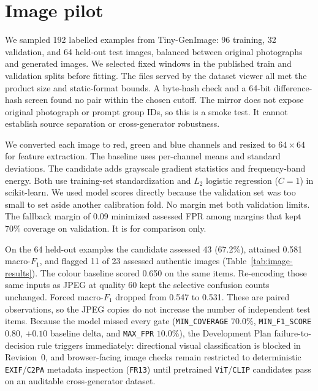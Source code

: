 \documentclass[11pt]{article}
\begin{document}
\section{Image pilot}

We sampled 192 labelled examples from Tiny-GenImage: 96 training, 32 validation, and 64 held-out test images, balanced between original photographs and generated images. We selected fixed windows in the published train and validation splits before fitting. The files served by the dataset viewer all met the product size and static-format bounds. A byte-hash check and a 64-bit difference-hash screen found no pair within the chosen cutoff. The mirror does not expose original photograph or prompt group IDs, so this is a smoke test. It cannot establish source separation or cross-generator robustness.

We converted each image to red, green and blue channels and resized to $64\times64$ for feature extraction. The baseline uses per-channel means and standard deviations. The candidate adds grayscale gradient statistics and frequency-band energy. Both use training-set standardization and $L_2$ logistic regression ($C=1$) in scikit-learn. We used model scores directly because the validation set was too small to set aside another calibration fold. No margin met both validation limits. The fallback margin of 0.09 minimized assessed FPR among margins that kept 70\% coverage on validation. It is for comparison only.

On the 64 held-out examples the candidate assessed 43 (67.2\%), attained 0.581 macro-$F_1$, and flagged 11 of 23 assessed authentic images (Table~\ref{tab:image-results}). The colour baseline scored 0.650 on the same items. Re-encoding those same inputs as JPEG at quality 60 kept the selective confusion counts unchanged. Forced macro-$F_1$ dropped from 0.547 to 0.531. These are paired observations, so the JPEG copies do not increase the number of independent test items. Because the model missed every gate (\texttt{MIN\_COVERAGE} $70.0\%$, \texttt{MIN\_F1\_SCORE} $0.80$, $+0.10$ baseline delta, and \texttt{MAX\_FPR} $10.0\%$), the Development Plan failure-to-decision rule triggers immediately: directional visual classification is blocked in Revision~0, and browser-facing image checks remain restricted to deterministic \texttt{EXIF}/\texttt{C2PA} metadata inspection (\texttt{FR13}) until pretrained \texttt{ViT}/\texttt{CLIP} candidates pass on an auditable cross-generator dataset.
\end{document}
